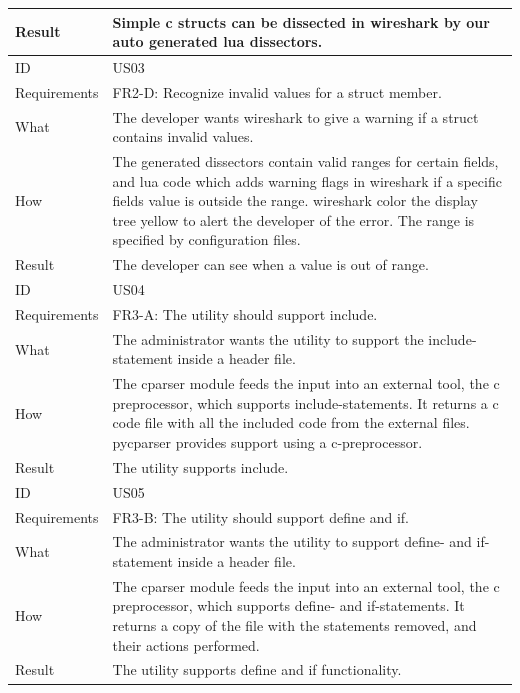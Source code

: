 \begin{table}[htbp]
{\begin{tabularx}{1.2\textwidth}{l X}
	Result & Simple \Gls{c} \glspl{struct} can be dissected in \Gls{wireshark} by our auto generated \Gls{lua} \glspl{dissector}. \\
	\midrule
	ID & US03 \\
	Requirements & FR2-D: Recognize invalid values for a \gls{struct} \gls{member}. \\
	What & The developer wants \Gls{wireshark} to give a warning if a \gls{struct} contains invalid values. \\
	How & The generated \glspl{dissector} contain valid ranges for certain fields, and \Gls{lua} code which adds warning flags 
		in \Gls{wireshark} if a specific fields value is outside the range. \Gls{wireshark} color the display tree yellow to alert the 
		developer of the error. The range is specified by configuration files. \\
	Result & The developer can see when a value is out of range. \\
	\midrule
	ID & US04 \\
	Requirements & FR3-A: The \gls{utility} should support \gls{include}.\\
	What & The administrator wants the \gls{utility} to support the \gls{include}-statement inside a \gls{header} file.\\
	How & The cparser module feeds the input into an external tool, the \Gls{c} \gls{preprocessor}, which supports 
		\gls{include}-statements. It returns a \Gls{c} code file with all the included code from the external files. pycparser
		provides support using a \Gls{c}-\gls{preprocessor}.  \\
	Result & The \gls{utility} supports \gls{include}. \\
	\midrule
	ID & US05 \\
	Requirements & FR3-B: The \gls{utility} should support \gls{define} and \gls{if}. \\
	What & The administrator wants the \gls{utility} to support \gls{define}- and \gls{if}-statement inside a \gls{header} file.\\
	How & The cparser module feeds the input into an external tool, the \Gls{c} \gls{preprocessor}, which supports 
		\gls{define}- and \gls{if}-statements. It returns a copy of the file with the statements removed, and their actions performed. \\
	Result & The \gls{utility} supports \gls{define} and \gls{if} functionality. \\
	\bottomrule
\end{tabularx}}
\end{table}

